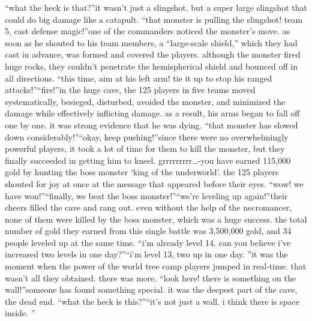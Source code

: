 “what the heck is that?”it wasn’t just a slingshot, but a super large slingshot that could do big damage like a catapult.
“that monster is pulling the slingshot! team 5, cast defense magic!”one of the commanders noticed the monster’s move.
 as soon as he shouted to his team members, a “large-scale shield,” which they had cast in advance, was formed and covered the players.
although the monster fired huge rocks, they couldn’t penetrate the hemispherical shield and bounced off in all directions.
“this time, aim at his left arm! tie it up to stop his ranged attacks!”“fire!”in the huge cave, the 125 players in five teams moved systematically, besieged, disturbed, avoided the monster, and minimized the damage while effectively inflicting damage.
as a result, his arms began to fall off one by one.
 it was strong evidence that he was dying.
“that monster has slowed down considerably!”“okay, keep pushing!”since there were no overwhelmingly powerful players, it took a lot of time for them to kill the monster, but they finally succeeded in getting him to kneel.
grrrrrrrrr…-you have earned 115,000 gold by hunting the boss monster ‘king of the underworld’.
the 125 players shouted for joy at once at the message that appeared before their eyes.
“wow! we have won!”“finally, we beat the boss monster!”“we’re leveling up again!”their cheers filled the cave and rang out.
 even without the help of the necromancer, none of them were killed by the boss monster, which was a huge success.
the total number of gold they earned from this single battle was 3,500,000 gold, and 34 people leveled up at the same time.
“i’m already level 14.
 can you believe i’ve increased two levels in one day?”“i’m level 13, two up in one day.
”it was the moment when the power of the world tree camp players jumped in real-time.
that wasn’t all they obtained.
 there was more.
“look here! there is something on the wall!”someone has found something special.
 it was the deepest part of the cave, the dead end.
“what the heck is this?”“it’s not just a wall.
 i think there is space inside.
”

